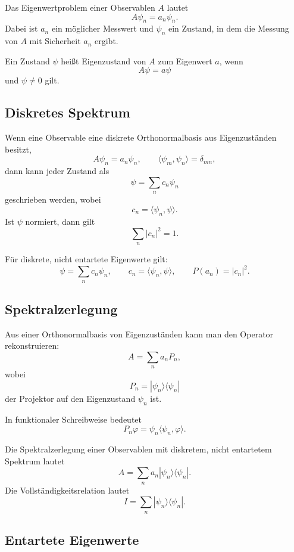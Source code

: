 Das Eigenwertproblem einer Observablen $A$ lautet
\[
    A\psi_n=a_n\psi_n.
\]
Dabei ist $a_n$ ein möglicher Messwert und $\psi_n$ ein Zustand, in dem die Messung von $A$ mit Sicherheit $a_n$ ergibt.

\begin{definitionbox}
Ein Zustand $\psi$ heißt Eigenzustand von $A$ zum Eigenwert $a$, wenn
\[
    A\psi=a\psi
\]
und $\psi\ne0$ gilt.
\end{definitionbox}

\subsection{Diskretes Spektrum}

Wenn eine Observable eine diskrete Orthonormalbasis aus Eigenzuständen besitzt,
\[
    A\psi_n=a_n\psi_n,
    \qquad
    \langle\psi_m,\psi_n\rangle=\delta_{mn},
\]
dann kann jeder Zustand als
\[
    \psi=\sum_n c_n\psi_n
\]
geschrieben werden, wobei
\[
    c_n=\langle\psi_n,\psi\rangle.
\]
Ist $\psi$ normiert, dann gilt
\[
    \sum_n |c_n|^2=1.
\]

\begin{formulabox}
Für diskrete, nicht entartete Eigenwerte gilt:
\[
    \psi=\sum_n c_n\psi_n,
    \qquad
    c_n=\langle\psi_n,\psi\rangle,
    \qquad
    P(a_n)=|c_n|^2.
\]
\end{formulabox}

\subsection{Spektralzerlegung}

Aus einer Orthonormalbasis von Eigenzuständen kann man den Operator rekonstruieren:
\[
    A=\sum_n a_n P_n,
\]
wobei
\[
    P_n=|\psi_n\rangle\langle\psi_n|
\]
der Projektor auf den Eigenzustand $\psi_n$ ist.

In funktionaler Schreibweise bedeutet
\[
    P_n\varphi=\psi_n\langle\psi_n,\varphi\rangle.
\]

\begin{formulabox}
Die Spektralzerlegung einer Observablen mit diskretem, nicht entartetem Spektrum lautet
\[
    A=\sum_n a_n |\psi_n\rangle\langle\psi_n|.
\]
Die Vollständigkeitsrelation lautet
\[
    I=\sum_n |\psi_n\rangle\langle\psi_n|.
\]
\end{formulabox}

\subsection{Entartete Eigenwerte}

